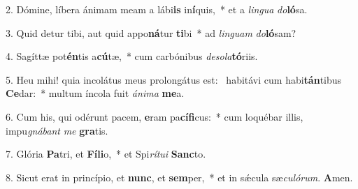 2. Dómine, líbera ánimam meam a lábi\textbf{is} in\textbf{í}quis,~*  et a \textit{lin}\textit{gua} \textit{do}\textbf{ló}sa.\

3. Quid detur tibi, aut quid appo\textbf{ná}tur \textbf{ti}bi~*  ad \textit{lin}\textit{guam} \textit{do}\textbf{ló}sam?\

4. Sagíttæ pot\textbf{én}tis a\textbf{cú}tæ,~*  cum carbónibus \textit{de}\textit{so}\textit{la}\textbf{tó}riis.\

5. Heu mihi! quia incolátus meus prolongátus est: \dag\  habitávi cum habi\textbf{tán}tibus \textbf{Ce}dar:~*  multum íncola fuit \textit{á}\textit{ni}\textit{ma} \textbf{me}a.\

6. Cum his, qui odérunt pacem, \textbf{e}ram pa\textbf{cí}\textbf{fi}cus:~*  cum loquébar illis, impu\textit{gná}\textit{bant} \textit{me} \textbf{gra}tis.\

7. Glória \textbf{Pa}tri, et \textbf{Fí}\textbf{li}o,~*  et Spi\textit{rí}\textit{tu}\textit{i} \textbf{Sanc}to.\

8. Sicut erat in princípio, et \textbf{nunc}, et \textbf{sem}per,~*  et in sǽcula sæ\textit{cu}\textit{ló}\textit{rum}. \textbf{A}men.\


